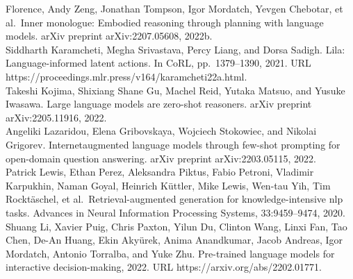 \documentclass[
]{article}
\begin{document}
Florence, Andy Zeng, Jonathan Tompson, Igor Mordatch, Yevgen Chebotar,
et al.~Inner monologue: Embodied reasoning through planning with
language models. arXiv preprint arXiv:2207.05608, 2022b.\\
Siddharth Karamcheti, Megha Srivastava, Percy Liang, and Dorsa Sadigh.
Lila: Language-informed latent actions. In CoRL, pp.~1379--1390, 2021.
URL https://proceedings.mlr.press/v164/karamcheti22a.html.\\
Takeshi Kojima, Shixiang Shane Gu, Machel Reid, Yutaka Matsuo, and
Yusuke Iwasawa. Large language models are zero-shot reasoners. arXiv
preprint arXiv:2205.11916, 2022.\\
Angeliki Lazaridou, Elena Gribovskaya, Wojciech Stokowiec, and Nikolai
Grigorev. Internetaugmented language models through few-shot prompting
for open-domain question answering. arXiv preprint arXiv:2203.05115,
2022.\\
Patrick Lewis, Ethan Perez, Aleksandra Piktus, Fabio Petroni, Vladimir
Karpukhin, Naman Goyal, Heinrich Küttler, Mike Lewis, Wen-tau Yih, Tim
Rocktäschel, et al.~Retrieval-augmented generation for
knowledge-intensive nlp tasks. Advances in Neural Information Processing
Systems, 33:9459--9474, 2020.\\
Shuang Li, Xavier Puig, Chris Paxton, Yilun Du, Clinton Wang, Linxi Fan,
Tao Chen, De-An Huang, Ekin Akyürek, Anima Anandkumar, Jacob Andreas,
Igor Mordatch, Antonio Torralba, and Yuke Zhu. Pre-trained language
models for interactive decision-making, 2022. URL
https://arxiv.org/abs/2202.01771.
\end{document}
